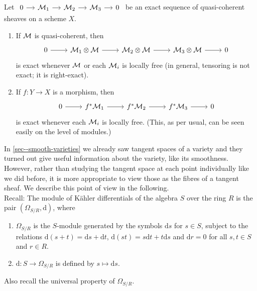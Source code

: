 \documentclass[a4paper,11pt]{article}
\begin{document}
			\begin{prop}
				Let $\begin{tikzcd}[column sep=small]
					0\ar[r] & \M_1\ar[r] & \M_2\ar[r] & \M_3\ar[r] & 0
				\end{tikzcd}$ be an exact sequence of quasi-coherent sheaves on a scheme $X$.
				\begin{enumerate}
					\item If $\mathcal{M}$ is quasi-coherent, then 
					\begin{equation*}
						\begin{tikzcd}
							0\ar[r] & \M_1\otimes\M\ar[r] & \M_2\otimes\M\ar[r] & \M_3\otimes\M\ar[r] & 0
						\end{tikzcd}
					\end{equation*} 
					is exact whenever $\mathcal{M}$ or each $\mathcal{M}_i$ is locally free (in general, tensoring is not exact; it is right-exact).
					\item If $f:Y\rightarrow X$ is a morphism, then 
					\begin{equation*}
						\begin{tikzcd}
							0\ar[r] & f^\ast\M_1\ar[r] & f^\ast\M_2\ar[r] & f^\ast\M_3\ar[r] & 0
						\end{tikzcd}
					\end{equation*}
					is exact whenever each $\mathcal{M}_i$ is locally free. (This, as per usual, can be seen easily on the level of modules.)
				\end{enumerate}
			\end{prop}

			In \autoref{sec--smooth-varieties} we already saw tangent spaces of a variety and they turned out give useful information about the variety, like its smoothness. However, rather than studying the tangent space at each point individually like we did before, it is more appropriate to view those as the fibres of a tangent sheaf. We describe this point of view in the following.
			\\

			\noindent Recall: The module of K{\"a}hler differentials of the algebra $S$ over the ring $R$ is the pair $(\Omega_{S/R},\mathrm{d})$, where
			\begin{enumerate}
				\item $\Omega_{S/R}$ is the $S$-module generated by the symbols $\mathrm{d}s$ for $s\in S$, subject to the relations $\mathrm{d}(s+t)=\mathrm{d}s+\mathrm{d}t$, $\mathrm{d}(st)=s\mathrm{d}t+t\mathrm{d}s$ and $\mathrm{d}r=0$ for all $s,t\in S$ and $r\in R$.
				\item $\mathrm{d}:S\rightarrow\Omega_{S/R}$ is defined by $s\mapsto\mathrm{d}s$.
			\end{enumerate}
			Also recall the universal property of $\Omega_{S/R}$.
			\\
\end{document}
